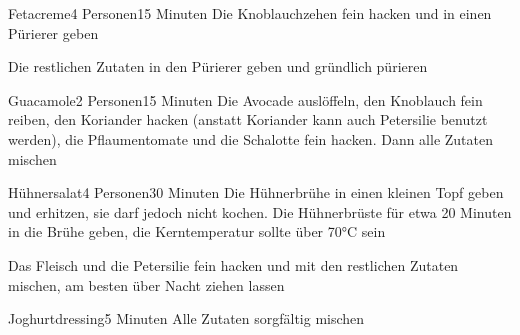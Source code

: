 
\begin{recipe}{Fetacreme}{4 Personen}{15 Minuten}
Die Knoblauchzehen fein hacken und in einen Pürierer geben

Die restlichen Zutaten in den Pürierer geben und gründlich pürieren

\end{recipe} 


\begin{recipe}{Guacamole}{2 Personen}{15 Minuten}
Die Avocade auslöffeln, den Knoblauch fein reiben, den Koriander hacken (anstatt Koriander kann auch Petersilie benutzt werden), die Pflaumentomate und die Schalotte fein hacken. Dann alle Zutaten mischen 
\end{recipe}


\begin{recipe}{Hühnersalat}{4 Personen}{30 Minuten}
Die Hühnerbrühe in einen kleinen Topf geben und erhitzen, sie darf jedoch nicht kochen. Die Hühnerbrüste für etwa 20 Minuten in die Brühe geben, die Kerntemperatur sollte über 70°C sein

Das Fleisch und die Petersilie fein hacken und mit den restlichen Zutaten mischen, am besten über Nacht ziehen lassen
\end{recipe}


\begin{recipe}{Joghurtdressing}{}{5 Minuten}
Alle Zutaten sorgfältig mischen
\end{recipe}

